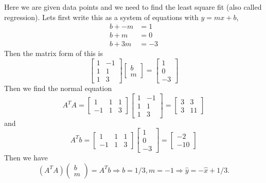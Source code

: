 \documentclass[reqno]{amsart}
\theoremstyle{definition}
\begin{document}
\begin{itemize}
Here we are given data points and we need to find the least square fit (also called regression).
Lets first write this as a system of equations with $y = mx + b$,
%
\begin{align*}
b + -m &= 1\\
b + m &= 0\\
b + 3m &= -3
\end{align*}
%
Then the matrix form of this is
%
\begin{equation*}
\begin{bmatrix}
1 & -1\\
1 & 1\\
1 & 3
\end{bmatrix} \begin{bmatrix}
b\\
m
\end{bmatrix} = \begin{bmatrix}
1\\
0\\
-3
\end{bmatrix}
\end{equation*}
%
Then we find the normal equation
%
\begin{equation*}
A^TA = \begin{bmatrix}
1 & 1 & 1\\
-1 & 1 & 3
\end{bmatrix} \begin{bmatrix}
1 & -1\\
1 & 1\\
1 & 3
\end{bmatrix} = \begin{bmatrix}
3 & 3\\
3 & 11
\end{bmatrix}
\end{equation*}
%
and
%
\begin{equation*}
A^Tb = \begin{bmatrix}
1 & 1 & 1\\
-1 & 1 & 3
\end{bmatrix} \begin{bmatrix}
1\\
0\\
-3
\end{bmatrix} = \begin{bmatrix}
-2\\
-10
\end{bmatrix}
\end{equation*}
%
Then we have
%
\begin{equation*}
(A^TA)\begin{pmatrix}
b\\
m
\end{pmatrix} = A^Tb \Rightarrow b = 1/3, m = -1 \Rightarrow \hat{y} = -\hat{x} + 1/3.
\end{equation*}


\end{itemize}
\end{document}
